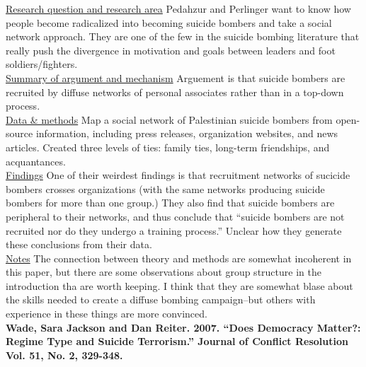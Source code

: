 \documentclass{article}[12pt]
\begin{document}
\underline{Research question and research area} Pedahzur and Perlinger want to know how people become radicalized into becoming suicide bombers and take a social network approach. They are one of the few in the suicide bombing literature that really push the divergence in motivation and goals between leaders and foot soldiers/fighters.\\
\underline{Summary of argument and mechanism} Arguement is that suicide bombers are recruited by diffuse networks of personal associates rather than in a top-down process.\\
\underline{Data \& methods} Map a social network of Palestinian suicide bombers from open-source information, including press releases, organization websites, and news articles. Created three levels of ties: family ties, long-term friendships, and acquantances.\\
\underline{Findings} One of their weirdest findings is that recruitment networks of sucicide bombers crosses organizations (with the same networks producing suicide bombers for more than one group.) They also find that suicide bombers are peripheral to their networks, and thus conclude that ``suicide bombers are not recruited nor do they undergo a training process.'' Unclear how they generate these conclusions from their data. \\
\underline{Notes} The connection between theory and methods are somewhat incoherent in this paper, but there are some observations about group structure in the introduction tha are worth keeping. I think that they are somewhat blase about the skills needed to create a diffuse bombing campaign--but others with experience in these things are more convinced. \\


\textbf{Wade, Sara Jackson and Dan Reiter. 2007. “Does Democracy Matter?: Regime Type and Suicide Terrorism.” Journal of Conflict Resolution Vol. 51, No. 2, 329-348.}
\end{document}
